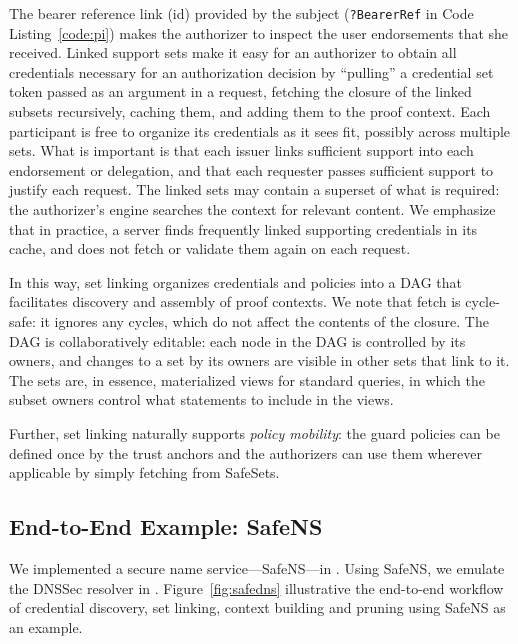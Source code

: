 The bearer reference link (id) provided by the subject ({\tt ?BearerRef} in
Code Listing~\ref{code:pi}) makes the authorizer to inspect the user
endorsements that she received. Linked support sets make it easy for an
authorizer to obtain all credentials necessary for an authorization decision by
``pulling'' a credential set token passed as an argument in a request, fetching
the closure of the linked subsets recursively, caching them, and adding them to
the proof context. Each participant is free to organize its credentials as it
sees fit, possibly across multiple sets. What is important is that each issuer
links sufficient support into each endorsement or delegation, and that each
requester passes sufficient support to justify each request. The linked sets
may contain a superset of what is required: the authorizer's 
engine searches the context for relevant content. We emphasize that in
practice, a server finds frequently linked supporting credentials in its cache,
and does not fetch or validate them again on each request. 

In this way, set linking organizes credentials and policies into a DAG that
facilitates discovery and assembly of proof contexts. We note that fetch is
cycle-safe: it ignores any cycles, which do not affect the contents of the
closure.  The DAG is collaboratively editable: each node in the DAG is
controlled by its owners, and changes to a set by its owners are visible in
other sets that link to it. The sets are, in essence, materialized views for
standard queries, in which the subset owners control what statements to include
in the views.

Further, set linking naturally supports {\it policy mobility}: the guard
policies can be defined once by the trust anchors and the authorizers can use
them wherever applicable by simply fetching from SafeSets. 


\subsection{End-to-End Example: SafeNS}
\label{sec:safedns}

We implemented a secure name service---SafeNS---in . Using
SafeNS, we emulate the DNSSec resolver in .
Figure~\ref{fig:safedns} illustrative the end-to-end workflow of credential
discovery, set linking, context building and pruning using SafeNS as an
example. 

